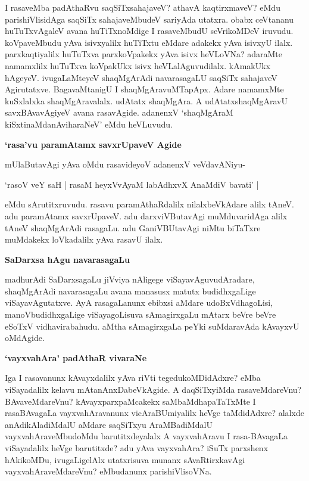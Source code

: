 I rasaveMba padAthaRvu saqSiTxsahajaveV? athavA kaqtirxmaveV? eMdu parishiVlisidAga saqSiTx sahajaveMbudeV sariyAda utatxra. obabx ceVtananu huTuTxvAgaleV avana huTiTxnoMdige I rasaveMbudU seVrikoMDeV iruvudu. koVpaveMbudu yAva isivxyalilx huTiTxtu eMdare adakekx yAva isivxyU ilalx. parxkaqtiyalilx huTuTxva parxkoVpakekx yAva isivx heVLoVNa? adaraMte namamxlilx huTuTxva koVpakUkx isivx heVLalAguvudilalx. kAmakUkx hAgeyeV. ivugaLaMteyeV shaqMgArAdi navarasagaLU saqSiTx sahajaveV Agirutatxve. BagavaMtanigU I shaqMgAravuMTapApx. Adare namamxMte kuSxlalxka shaqMgAravalalx. udAtatx shaqMgAra. A udAtatxshaqMgAravU savxBAvavAgiyeV avana rasavAgide. adanenxV `shaqMgAraM kiSxtinaMdanAviharaNeV' eMdu heVLuvudu.

\noindent
{\bf\large{`rasa'vu paramAtamx savxrUpaveV Agide}}\label{page222}

mUlaButavAgi yAva oMdu rasavideyoV adanenxV veVdavANiyu-

\begin{shloka}
`rasoV veY saH | rasaM heyxVvAyaM labAdhxvX AnaMdiV bavati' |
\end{shloka}

eMdu sArutitxruvudu. rasavu paramAthaRdalilx nilalxbeVkAdare alilx tAneV. adu paramAtamx savxrUpaveV. adu darxviVButavAgi muMduvaridAga alilx tAneV shaqMgArAdi rasagaLu. adu GaniVBUtavAgi niMtu biTaTxre muMdakekx loVkadalilx yAva rasavU ilalx.

\noindent
{\bf\large{SaDarxsa hAgu navarasagaLu}}\label{page223}

madhurAdi SaDarxsagaLu jiVviya nAligege viSayavAguvudAradare, shaqMgArAdi navarasagaLu avana manasusx matutx budidhxgaLige viSayavAgutatxve. AyA rasagaLanunx ebibxsi aMdare udoBxVdhagoLisi, manoVbudidhxgaLige viSayagoLisuva sAmagirxgaLu mAtarx beVre beVre eSoTxV vidhavirabahudu. aMtha sAmagirxgaLa peYki suMdaravAda kAvayxvU oMdAgide. 

\noindent
{\bf\large{`vayxvahAra' padAthaR vivaraNe}}\label{page223}

Iga I rasavanunx kAvayxdalilx yAva riVti tegedukoMDidAdxre? eMba viSayadalilx kelavu mAtanAnxDabeVkAgide. A daqSiTxyiMda rasaveMdareVnu? BAvaveMdareVnu? kAvayxparxpaMcakekx saMbaMdhapaTaTxMte I rasaBAvagaLa vayxvahAravanunx vicAraBUmiyalilx heVge taMdidAdxre? alalxde anAdikAladiMdalU aMdare saqSiTxyu AraMBadiMdalU vayxvahAraveMbudoMdu barutitxdeyalalx A vayxvahAravu I rasa-BAvagaLa viSayadalilx heVge barutitxde? adu yAva vayxvahAra? iSuTx parxshenx hAkikoMDu, ivugaLigelAlx utatxrisuva munanx sAvaRtirxkavAgi vayxvahAraveMdareVnu? eMbudanunx parishiVlisoVNa.

